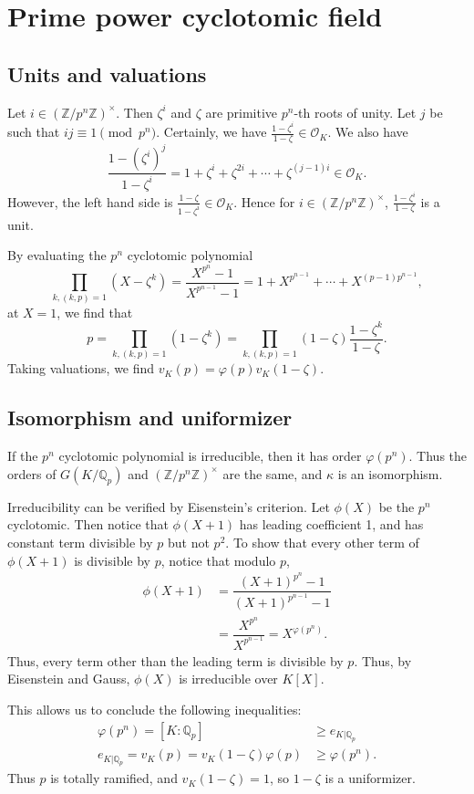 \documentclass[12pt]{amsart}
\theoremstyle{named}
\newcommand{\roi}[1]{\mathcal{O}_{#1}}
\newcommand{\Zmod}[1]{\mathbb{Z}/#1 \mathbb{Z}}
\newcommand{\Z}{\mathbb{Z}}
\newcommand{\Q}{\mathbb{Q}}
\newcommand{\Qp}{\Q_p}
\begin{document}
\section{Prime power cyclotomic field}
\subsection{Units and valuations} Let $i
\in \left(\Zmod {p^n}\right)^\times$. Then $\zeta^i$ and $\zeta$ are primitive $p^n$-th roots of
unity. Let $j$ be such that $ij \equiv 1 \pmod{p^n}$. Certainly, we have $\frac{1 - \zeta^i}{1 -
\zeta} \in \roi K$. We also have \[\frac{1 - (\zeta^i)^j}{1 - \zeta^i} = 1 + \zeta^i + \zeta^{2i} +
\cdots + \zeta^{(j - 1)i} \in \roi K.\] However, the left hand side is $\frac{1 - \zeta}{1 -
\zeta^i} \in \roi K$. Hence for
$i \in \left(\Zmod {p^n}\right)^\times$, $\frac{1 - \zeta^i}{1 - \zeta}$ is a unit.

By evaluating the $p^n$ cyclotomic polynomial \[ \prod_{k, (k, p) = 1} (X - \zeta^k) =
\dfrac{X^{p^n} - 1}{X^{p^{n - 1}} - 1} = 1 + X^{p^{n - 1}} + \cdots + X^{(p - 1) p^{n - 1}},\] at $X
= 1$, we find that \[ p = \prod_{k, (k, p) = 1} (1 - \zeta^k) = \prod_{k, (k, p) = 1} (1 - \zeta)
\dfrac{1 - \zeta^k}{1 - \zeta}. \] Taking valuations, we find $v_K(p) = \varphi(p) v_K(1 - \zeta)$.

\subsection{Isomorphism and uniformizer} If the $p^n$ cyclotomic polynomial is irreducible, then
it has order $\varphi(p^n)$. Thus the orders of $G(K/\Qp)$ and $\left(\Z/p^n \Z \right)^\times$ are
the same, and $\kappa$ is an isomorphism.

Irreducibility can be verified by Eisenstein's criterion. Let $\phi(X)$ be the $p^n$ cyclotomic.
Then notice that $\phi(X + 1)$ has leading coefficient 1, and has constant term divisible by $p$ but
not $p^2$. To show that every other term of $\phi(X + 1)$ is divisible by $p$, notice that modulo
$p$,
\begin{align*}
\phi(X + 1) & = \dfrac{(X + 1)^{p^n} - 1}{(X + 1)^{p^{n - 1}} - 1} \\
& = \dfrac{X^{p^n}}{X^{p^{n - 1}}} = X^{\varphi(p^n)}.
\end{align*}
Thus, every term other than the leading term is divisible by $p$. Thus, by Eisenstein and Gauss,
$\phi(X)$ is irreducible over $K[X]$.

This allows us to conclude the following inequalities:
\begin{align*}
\varphi(p^n) = [K : \Qp] & \geq e_{K|\Qp} \\
e_{K|\Qp} = v_K(p) = v_K(1 - \zeta) \varphi(p) & \geq \varphi(p^n).
\end{align*}
Thus $p$ is totally ramified, and $v_K(1 - \zeta) = 1$, so $1 - \zeta$ is a uniformizer.
\end{document}

